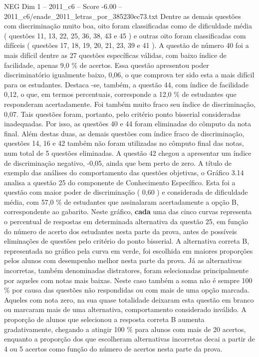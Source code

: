 \begin{textsample}{NEG Dim 1 – 2011\_c6 – Score -6.00 – 2011\_c6/enade\_2011\_letras\_por\_385230ec73.txt}
Dentre as demais questões com discriminação muito boa, oito foram classificadas como de dificuldade média ( questões 11, 13, 22, 25, 36, 38, 43 e 45 ) e outras oito foram classificadas com difíceis ( questões 17, 18, 19, 20, 21, 23, 39 e 41 ).
A questão de número 40 foi a mais difícil dentre as 27 questões específicas válidas, com baixo índice de facilidade, apenas 9,0 \% de acertos.
Essa questão apresentou poder discriminatório igualmente baixo, 0,06, o que comprova ter sido esta a mais difícil para os estudantes.
Destaca -se, também, a questão 44, com índice de facilidade 0,12, o que, em termos percentuais, corresponde a 12,0 \% de estudantes que responderam acertadamente.
Foi também muito fraco seu índice de discriminação, 0,07.
Tais questões foram, portanto, pelo critério ponto bisserial consideradas inadequadas.
Por isso, as questões 40 e 44 foram eliminadas do cômputo da nota final.
Além destas duas, as demais questões com índice fraco de discriminação, questões 14, 16 e 42 também não foram utilizadas no cômputo final das notas, num total de 5 questões eliminadas.
A questão 42 chegou a apresentar um índice de discriminação negativo, -0,05, ainda que bem perto de zero.
A título de exemplo das análises do comportamento das questões objetivas, o Gráfico 3.14 analisa a questão 25 do componente de Conhecimento Específico.
Esta foi a questão com maior poder de discriminação ( 0,60 ) e considerada de dificuldade média, com 57,0 \% de estudantes que assinalaram acertadamente a opção B, correspondente ao gabarito.
Neste gráfico, \textbf{cada} uma das cinco curvas representa o percentual de respostas em determinada alternativa da questão 25, em função do número de acerto dos estudantes nesta parte da prova, antes de possíveis eliminações de questões pelo critério do ponto bisserial.
A alternativa correta B, representada no gráfico pela curva em verde, foi escolhida em maiores proporções pelos alunos com desempenho melhor nesta parte da prova.
Já as alternativas incorretas, também denominadas distratores, foram selecionadas principalmente por aqueles com notas mais baixas.
Neste caso também a soma não é sempre 100 \% por causa das questões não respondidas ou com mais de uma opção marcada.
Aqueles com nota zero, na sua quase totalidade deixaram esta questão em branco ou marcaram mais de uma alternativa, comportamento considerado inválido.
A proporção de alunos que selecionou a resposta correta B aumenta gradativamente, chegando a atingir 100 \% para alunos com mais de 20 acertos, enquanto a proporção dos que escolheram alternativas incorretas decai a partir de 4 ou 5 acertos como função do número de acertos nesta parte da prova.

\end{textsample}
